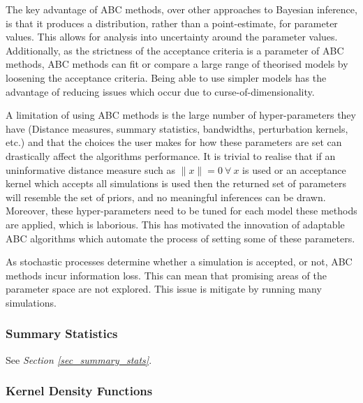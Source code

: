 \documentclass[11pt,a4paper]{article}
\theoremstyle{break}
\begin{document}
  \par The key advantage of ABC methods, over other approaches to Bayesian inference, is that it produces a distribution, rather than a point-estimate, for parameter values. This allows for analysis into uncertainty around the parameter values. Additionally, as the strictness of the acceptance criteria is a parameter of ABC methods, ABC methods can fit or compare a large range of theorised models by loosening the acceptance criteria. Being able to use simpler models has the advantage of reducing issues which occur due to curse-of-dimensionality.

  \par A limitation of using ABC methods is the large number of hyper-parameters they have (Distance measures, summary statistics, bandwidths, perturbation kernels, etc.) and that the choices the user makes for how these parameters are set can drastically affect the algorithms performance. It is trivial to realise that if an uninformative distance measure such as $\|x\|=0\ \forall\ x$ is used or an acceptance kernel which accepts all simulations is used then the returned set of parameters will resemble the set of priors, and no meaningful inferences can be drawn. Moreover, these hyper-parameters need to be tuned for each model these methods are applied, which is laborious. This has motivated the innovation of adaptable ABC algorithms which automate the process of setting some of these parameters.

  \par As stochastic processes determine whether a simulation is accepted, or not, ABC methods incur information loss. This can mean that promising areas of the parameter space are not explored. This issue is mitigate by running many simulations.


\subsubsection*{Summary Statistics}

  \par See \textit{Section \ref{sec_summary_stats}}.

\subsubsection*{Kernel Density Functions}
\end{document}
